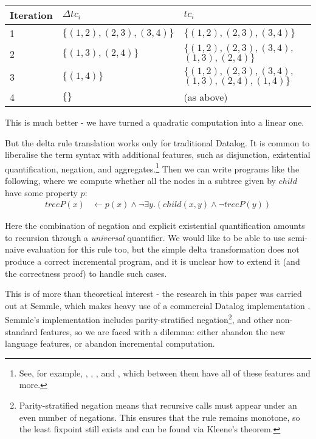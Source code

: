 \begin{center}
  \begin{tabular} {|p{3.5em}|p{10em}|p{10em}|}
    \hline
    Iteration & $\Delta tc_i$ & $tc_i$ \\
    \hline
    1 & $\{ (1, 2), (2, 3), (3, 4) \}$ & $\{ (1, 2), (2, 3), (3, 4) \}$\\
    2 & $\{ (1, 3), (2, 4) \}$ & $\{ (1, 2), (2, 3), (3, 4),$ $(1, 3), (2, 4) \}$\\
    3 & $\{ (1, 4) \}$ & $\{ (1, 2), (2, 3), (3, 4),$ $(1, 3), (2, 4), (1, 4) \}$\\
    4 & $\{ \}$ & (as above) \\
    \hline
  \end{tabular}
\end{center}

This is much better - we have turned a quadratic computation into a linear one.

But the delta rule translation works only for traditional Datalog. It is common to
liberalise the term syntax with additional features, such as disjunction,
existential quantification, negation, and aggregates.\footnote{ See, for
  example, \autocites(LogiQL)(){logicbloxWebsite}{halpin2014logiql},
  \autocites(Datomic)(){datomicWebsite},
  \autocites(Souffle)(){souffleWebsite}{scholz2016fast}, and
  \autocites(DES)(){saenz2011deductive}, which between them have all of these
  features and more. } 
Then we can write programs like the following, where we compute whether all the
nodes in a subtree given by $child$ have some property $p$:
\begin{align*}
  treeP(x) &\leftarrow p(x) \wedge \neg \exists y . (child(x,y) \wedge \neg treeP(y))
\end{align*}

Here the combination of negation and explicit existential quantification amounts
to recursion through a \emph{universal} quantifier. We would
like to be able to use semi-naive evaluation for this rule too, but the simple delta
transformation does not produce a correct incremental program, and it is unclear how to extend it (and the
correctness proof) to handle such cases.

This is of more than theoretical interest - the research
in this paper was carried out at Semmle, which
makes heavy use of a commercial Datalog implementation
\autocites{semmleWebsite}{avgustinov2016ql}{sereni2008adding}{schafer2010type}.
Semmle's implementation includes parity-stratified negation\footnote{Parity-stratified negation means that recursive calls must
  appear under an even number of negations. This ensures that the rule remains
  monotone, so the least fixpoint still exists and can be found via Kleene's theorem.}, and other non-standard
features, so we are faced with a dilemma: either abandon the new language
features, or abandon incremental computation.

